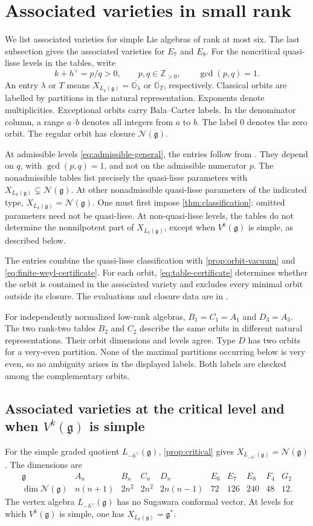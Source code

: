 \documentclass[11pt,a4paper]{amsart}
\numberwithin{equation}{section}
\theoremstyle{definition}
\theoremstyle{remark}
\newcommand{\Z}{\mathbb Z}
\newcommand{\g}{\mathfrak g}
\newcommand{\N}{\mathcal N}
\newcommand{\OO}{\mathbb O}
\begin{document}
\section{Associated varieties in small rank}\label{app:associated-varieties}
We list associated varieties for simple Lie algebras of rank at most six.
The last subsection gives the associated varieties for $E_7$ and $E_8$.
For the noncritical quasi-lisse levels in the tables, write
$$
 k+h^\vee=p/q>0,\qquad p,q\in\Z_{>0},\qquad \gcd(p,q)=1.
$$
An entry $\lambda$ or $T$ means $X_{L_k(\g)}=\overline{\OO_\lambda}$
or $\overline{\OO_T}$, respectively. Classical orbits are labelled by
partitions in the natural representation. Exponents denote multiplicities.
Exceptional orbits carry Bala--Carter labels. In the denominator column,
a range $a\text{--}b$ denotes all integers from $a$ to $b$. The label $0$ denotes the
zero orbit. The regular orbit has closure $\N(\g)$.

At admissible levels \eqref{eq:admissible-general}, the entries follow
from \cite[Theorems~5.7.1 and~5.8.1]{AAV}. They depend on $q$, with
$\gcd(p,q)=1$, and not on the admissible numerator $p$.
The nonadmissible tables list precisely the quasi-lisse parameters with
$X_{L_k(\g)}\subsetneq\N(\g)$. At other nonadmissible quasi-lisse parameters of the
indicated type, $X_{L_k(\g)}=\N(\g)$. One must first impose
\cref{thm:classification}: omitted parameters need not be quasi-lisse.
At non-quasi-lisse levels, the tables do not determine the nonnilpotent
part of $X_{L_k(\g)}$, except when $V^k(\g)$ is simple, as described below.

The entries combine the quasi-lisse classification with
\cref{prop:orbit-vacuum} and \eqref{eq:finite-weyl-certificate}.
For each orbit, \eqref{eq:table-certificate} determines whether the orbit is contained in the associated variety and excludes
every minimal orbit outside its closure. The evaluations and closure
data are in \cite{Certificates}.

For independently normalized low-rank algebras, $B_1=C_1=A_1$ and
$D_3=A_3$. The two rank-two tables $B_2$ and $C_2$ describe the same
orbits in different natural representations. Their orbit dimensions and
levels agree. Type $D$ has two orbits for a very-even partition. None of
the maximal partitions occurring below is very even, so no ambiguity
arises in the displayed labels. Both labels are checked among
the complementary orbits.

\subsection{Associated varieties at the critical level and when \texorpdfstring{$V^k(\g)$}{Vk(g)} is simple}
For the simple graded quotient $L_{-h^\vee}(\g)$, \cref{prop:critical} gives
$X_{L_{-h^\vee}(\g)}=\N(\g)$. The dimensions are
$$
\begin{array}{c|ccccccccc}
\g&A_n&B_n&C_n&D_n&E_6&E_7&E_8&F_4&G_2\\\hline
\dim\N(\g)&n(n+1)&2n^2&2n^2&2n(n-1)&72&126&240&48&12.
\end{array}
$$
The vertex algebra $L_{-h^\vee}(\g)$ has no Sugawara conformal
vector. At levels for which $V^k(\g)$ is simple, one has
$X_{L_k(\g)}=\g^*$.
\end{document}
